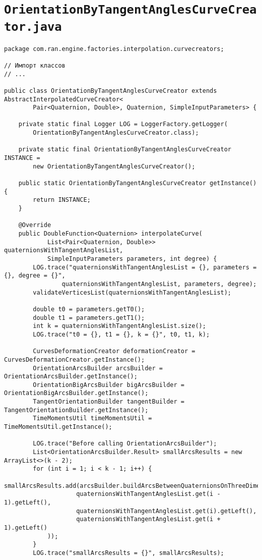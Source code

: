\section*{\texttt{OrientationByTangentAnglesCurveCreator.java}}
\begin{verbatim}
package com.ran.engine.factories.interpolation.curvecreators;

// Импорт классов
// ...

public class OrientationByTangentAnglesCurveCreator extends AbstractInterpolatedCurveCreator<
        Pair<Quaternion, Double>, Quaternion, SimpleInputParameters> {

    private static final Logger LOG = LoggerFactory.getLogger(
        OrientationByTangentAnglesCurveCreator.class);

    private static final OrientationByTangentAnglesCurveCreator INSTANCE =
        new OrientationByTangentAnglesCurveCreator();

    public static OrientationByTangentAnglesCurveCreator getInstance() {
        return INSTANCE;
    }

    @Override
    public DoubleFunction<Quaternion> interpolateCurve(
            List<Pair<Quaternion, Double>> quaternionsWithTangentAnglesList,
            SimpleInputParameters parameters, int degree) {
        LOG.trace("quaternionsWithTangentAnglesList = {}, parameters = {}, degree = {}",
                quaternionsWithTangentAnglesList, parameters, degree);
        validateVerticesList(quaternionsWithTangentAnglesList);

        double t0 = parameters.getT0();
        double t1 = parameters.getT1();
        int k = quaternionsWithTangentAnglesList.size();
        LOG.trace("t0 = {}, t1 = {}, k = {}", t0, t1, k);

        CurvesDeformationCreator deformationCreator = CurvesDeformationCreator.getInstance();
        OrientationArcsBuilder arcsBuilder = OrientationArcsBuilder.getInstance();
        OrientationBigArcsBuilder bigArcsBuilder = OrientationBigArcsBuilder.getInstance();
        TangentOrientationBuilder tangentBuilder = TangentOrientationBuilder.getInstance();
        TimeMomentsUtil timeMomentsUtil = TimeMomentsUtil.getInstance();

        LOG.trace("Before calling OrientationArcsBuilder");
        List<OrientationArcsBuilder.Result> smallArcsResults = new ArrayList<>(k - 2);
        for (int i = 1; i < k - 1; i++) {
            smallArcsResults.add(arcsBuilder.buildArcsBetweenQuaternionsOnThreeDimensionalSphere(
                    quaternionsWithTangentAnglesList.get(i - 1).getLeft(),
                    quaternionsWithTangentAnglesList.get(i).getLeft(),
                    quaternionsWithTangentAnglesList.get(i + 1).getLeft()
            ));
        }
        LOG.trace("smallArcsResults = {}", smallArcsResults);


\end{verbatim}
